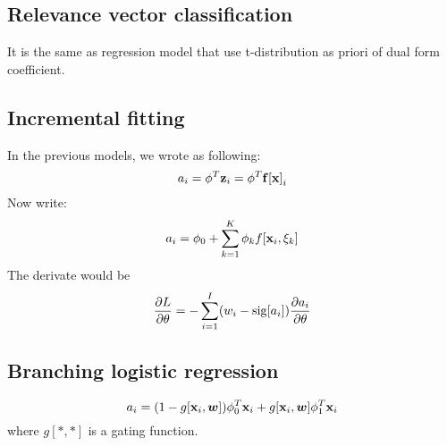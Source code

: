 \documentclass[12pt,a4paper]{article}
\begin{document}
\subsection*{Relevance vector classification}
It is the same as regression model that use t-distribution as priori of dual form coefficient.
\subsection*{Incremental fitting}
In the previous models, we wrote as following:
$$
a_i = \phi^T{\bf z}_i = \phi^T{\bf f[x]}_i
$$
Now write:
$$
a_i = \phi_0+\sum_{k=1}^{K}\phi_kf[{\bf x}_i,\xi_k]
$$
The derivate would be 
$$
\frac{\partial L}{\partial \theta} = -\sum_{i=1}^{I}(w_i-{\rm sig}[a_i])\frac{\partial a_i}{\partial \theta}
$$
\subsection*{Branching logistic regression}
$$
a_i = (1-g[{\bf x}_i,{\boldsymbol w}])\phi^T_0{\bf x}_i+g[{\bf x}_i,{\boldsymbol w}]\phi_1^T{\bf x}_i
$$
where $g[*,*]$ is a gating function.
\end{document}
